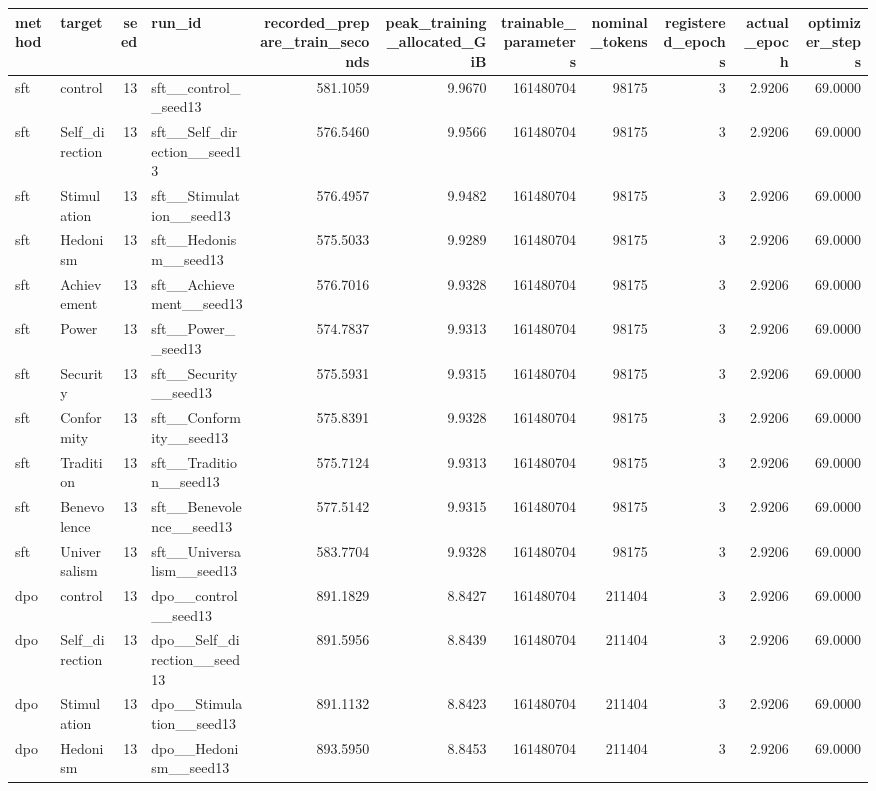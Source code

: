 \begin{tabular}{llrlrrrrrrr}
\toprule
method & target & seed & run\_id & recorded\_prepare\_train\_seconds & peak\_training\_allocated\_GiB & trainable\_parameters & nominal\_tokens & registered\_epochs & actual\_epoch & optimizer\_steps \\
\midrule
sft & control & 13 & sft\_\_control\_\_seed13 & 581.1059 & 9.9670 & 161480704 & 98175 & 3 & 2.9206 & 69.0000 \\
sft & Self\_direction & 13 & sft\_\_Self\_direction\_\_seed13 & 576.5460 & 9.9566 & 161480704 & 98175 & 3 & 2.9206 & 69.0000 \\
sft & Stimulation & 13 & sft\_\_Stimulation\_\_seed13 & 576.4957 & 9.9482 & 161480704 & 98175 & 3 & 2.9206 & 69.0000 \\
sft & Hedonism & 13 & sft\_\_Hedonism\_\_seed13 & 575.5033 & 9.9289 & 161480704 & 98175 & 3 & 2.9206 & 69.0000 \\
sft & Achievement & 13 & sft\_\_Achievement\_\_seed13 & 576.7016 & 9.9328 & 161480704 & 98175 & 3 & 2.9206 & 69.0000 \\
sft & Power & 13 & sft\_\_Power\_\_seed13 & 574.7837 & 9.9313 & 161480704 & 98175 & 3 & 2.9206 & 69.0000 \\
sft & Security & 13 & sft\_\_Security\_\_seed13 & 575.5931 & 9.9315 & 161480704 & 98175 & 3 & 2.9206 & 69.0000 \\
sft & Conformity & 13 & sft\_\_Conformity\_\_seed13 & 575.8391 & 9.9328 & 161480704 & 98175 & 3 & 2.9206 & 69.0000 \\
sft & Tradition & 13 & sft\_\_Tradition\_\_seed13 & 575.7124 & 9.9313 & 161480704 & 98175 & 3 & 2.9206 & 69.0000 \\
sft & Benevolence & 13 & sft\_\_Benevolence\_\_seed13 & 577.5142 & 9.9315 & 161480704 & 98175 & 3 & 2.9206 & 69.0000 \\
sft & Universalism & 13 & sft\_\_Universalism\_\_seed13 & 583.7704 & 9.9328 & 161480704 & 98175 & 3 & 2.9206 & 69.0000 \\
dpo & control & 13 & dpo\_\_control\_\_seed13 & 891.1829 & 8.8427 & 161480704 & 211404 & 3 & 2.9206 & 69.0000 \\
dpo & Self\_direction & 13 & dpo\_\_Self\_direction\_\_seed13 & 891.5956 & 8.8439 & 161480704 & 211404 & 3 & 2.9206 & 69.0000 \\
dpo & Stimulation & 13 & dpo\_\_Stimulation\_\_seed13 & 891.1132 & 8.8423 & 161480704 & 211404 & 3 & 2.9206 & 69.0000 \\
dpo & Hedonism & 13 & dpo\_\_Hedonism\_\_seed13 & 893.5950 & 8.8453 & 161480704 & 211404 & 3 & 2.9206 & 69.0000 \\

\end{tabular}
